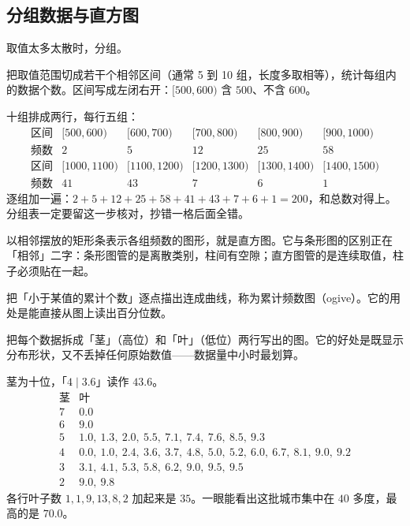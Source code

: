 \subsection{分组数据与直方图}

取值太多太散时，分组。

\begin{definition}[组距分组]
把取值范围切成若干个相邻区间（通常 5 到 10 组，长度多取相等），统计每组内的数据个数。区间写成左闭右开：$[500,600)$ 含 $500$、不含 $600$。
\end{definition}

\begin{example}[200 只白炽灯的寿命（组距 100）]
十组排成两行，每行五组：
\[
\begin{array}{c|ccccc}
\text{区间} & [500{,}600) & [600{,}700) & [700{,}800) & [800{,}900) & [900{,}1000)\\ \hline
\text{频数} & 2 & 5 & 12 & 25 & 58\\[4pt]
\text{区间} & [1000{,}1100) & [1100{,}1200) & [1200{,}1300) & [1300{,}1400) & [1400{,}1500)\\ \hline
\text{频数} & 41 & 43 & 7 & 6 & 1
\end{array}
\]
逐组加一遍：$2+5+12+25+58+41+43+7+6+1=200$，和总数对得上。分组表一定要留这一步核对，抄错一格后面全错。
\end{example}

\begin{definition}[直方图]
以相邻摆放的矩形条表示各组频数的图形，就是直方图。它与条形图的区别正在「相邻」二字：条形图管的是离散类别，柱间有空隙；直方图管的是连续取值，柱子必须贴在一起。
\end{definition}

\begin{definition}[累计频数图]
把「小于某值的累计个数」逐点描出连成曲线，称为累计频数图（ogive）。它的用处是能直接从图上读出百分位数。
\end{definition}

\begin{definition}[茎叶图]
把每个数据拆成「茎」（高位）和「叶」（低位）两行写出的图。它的好处是既显示分布形状，又不丢掉任何原始数值——数据量中小时最划算。
\end{definition}

\begin{example}
茎为十位，「$4\mid 3.6$」读作 $43.6$。
\[
\begin{array}{c|l}
\text{茎} & \text{叶}\\ \hline
7 & 0.0\\
6 & 9.0\\
5 & 1.0,\ 1.3,\ 2.0,\ 5.5,\ 7.1,\ 7.4,\ 7.6,\ 8.5,\ 9.3\\
4 & 0.0,\ 1.0,\ 2.4,\ 3.6,\ 3.7,\ 4.8,\ 5.0,\ 5.2,\ 6.0,\ 6.7,\ 8.1,\ 9.0,\ 9.2\\
3 & 3.1,\ 4.1,\ 5.3,\ 5.8,\ 6.2,\ 9.0,\ 9.5,\ 9.5\\
2 & 9.0,\ 9.8
\end{array}
\]
各行叶子数 $1,1,9,13,8,2$ 加起来是 $35$。一眼能看出这批城市集中在 $40$ 多度，最高的是 $70.0$。
\end{example}

